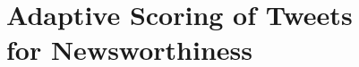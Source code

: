 
\newpage
\chapter[Adaptive Scoring of Tweets for Newsworthiness]{Adaptive Scoring of Tweets\\for Newsworthiness}
\label{chapter:newsworthiness}






